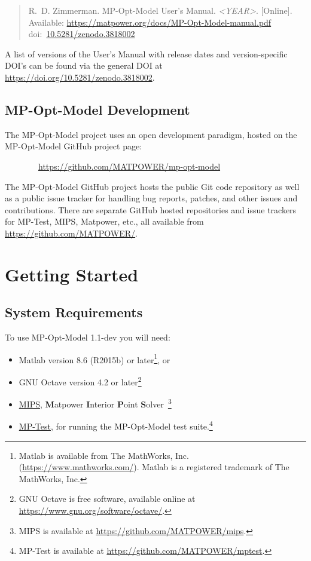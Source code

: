 \documentclass[12pt]{article}
\newcommand{\matlab}[0]{{\sc Matlab}}
\newcommand{\matpower}[0]{{\sc Matpower}}
\newcommand{\mptest}[0]{{MP-Test}}
\newcommand{\mptesturl}[0]{https://github.com/MATPOWER/mptest}
\newcommand{\mptestlink}[0]{\href{\mptesturl}{\mptest{}}}
\newcommand{\mips}[0]{{MIPS}}
\newcommand{\mipsurl}[0]{https://github.com/MATPOWER/mips}
\newcommand{\mipslink}[0]{\href{\mipsurl}{\mips{}}}
\newcommand{\mipsname}[0]{{{\bf M}{\sc atpower} \textbf{I}nterior \textbf{P}oint \textbf{S}olver}}
\newcommand{\mpom}[0]{\mbox{MP-Opt-Model}}
\newcommand{\mpomurl}[0]{https://github.com/MATPOWER/mp-opt-model}
\newcommand{\mpomname}[0]{\mpom{}}
\newcommand{\mpomver}[0]{1.1-dev}
\newcommand{\doi}[1]{doi:~\href{https://doi.org/#1}{#1}}
\numberwithin{equation}{section}
\numberwithin{table}{section}
\numberwithin{figure}{section}
\begin{document}
\begin{quote}
\footnotesize
R.~D. Zimmerman. \mpomname{} User's Manual. \emph{\textless{}YEAR\textgreater{}}.
[Online]. Available: \url{https://matpower.org/docs/MP-Opt-Model-manual.pdf}\\
\doi{10.5281/zenodo.3818002}
\end{quote}
A list of versions of the User's Manual with release dates and
version-specific DOI's can be found via the general DOI at
\url{https://doi.org/10.5281/zenodo.3818002}.

\subsection{\mpom{} Development}
\label{sec:development}

The \mpom{} project uses an open development paradigm, hosted on the \mpom{} GitHub project page:

\bigskip

~~~~~~~~\url{\mpomurl}

\bigskip

The \mpom{} GitHub project hosts the public Git code repository as well as a public issue tracker for handling bug reports, patches, and other issues and contributions. There are separate GitHub hosted repositories and issue trackers for \mptest{}, \mips{}, \matpower{}, etc., all available from \url{https://github.com/MATPOWER/}.


\clearpage
\section{Getting Started}

\subsection{System Requirements}
\label{sec:sysreq}
To use \mpom{} \mpomver{} you will need:
\begin{itemize}
\item \matlab{}\textsuperscript{\tiny \textregistered} version 8.6 (R2015b) or later\footnote{\matlab{} is available from The MathWorks, Inc. (\url{https://www.mathworks.com/}). \matlab{} is a registered trademark of The MathWorks, Inc.}, or
\item GNU Octave version 4.2 or later\footnote{GNU Octave \cite{octave} is free software, available online at \url{https://www.gnu.org/software/octave/}.}
\item \mipslink{}, \mipsname{}~\cite{wang2007a, mips_manual}\footnote{\mips{} is available at \url{\mipsurl}.}
\item \mptestlink{}, for running the \mpom{} test suite.\footnote{\mptest{} is available at \url{\mptesturl}.}
\end{itemize}
\end{document}
